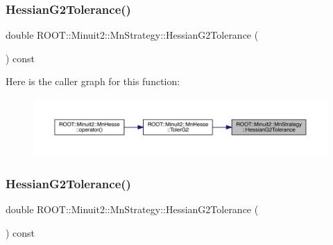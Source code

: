 \subsubsection{\texorpdfstring{HessianG2Tolerance()}{HessianG2Tolerance()}\hspace{0.1cm}{\footnotesize\ttfamily [1/2]}}
{\footnotesize\ttfamily double R\+O\+O\+T\+::\+Minuit2\+::\+Mn\+Strategy\+::\+Hessian\+G2\+Tolerance (\begin{DoxyParamCaption}{ }\end{DoxyParamCaption}) const\hspace{0.3cm}{\ttfamily [inline]}}

Here is the caller graph for this function\+:\nopagebreak
\begin{figure}[H]
\begin{center}
\leavevmode
\includegraphics[width=350pt]{da/de4/classROOT_1_1Minuit2_1_1MnStrategy_a0b111848a04cb9b95615402c78709846_icgraph}
\end{center}
\end{figure}
\mbox{\label{classROOT_1_1Minuit2_1_1MnStrategy_a0b111848a04cb9b95615402c78709846}} 
\subsubsection{\texorpdfstring{HessianG2Tolerance()}{HessianG2Tolerance()}\hspace{0.1cm}{\footnotesize\ttfamily [2/2]}}
{\footnotesize\ttfamily double R\+O\+O\+T\+::\+Minuit2\+::\+Mn\+Strategy\+::\+Hessian\+G2\+Tolerance (\begin{DoxyParamCaption}{ }\end{DoxyParamCaption}) const\hspace{0.3cm}{\ttfamily [inline]}}

\mbox{\label{classROOT_1_1Minuit2_1_1MnStrategy_a49354e374820b73f7e8b6701d7e07922}} 
